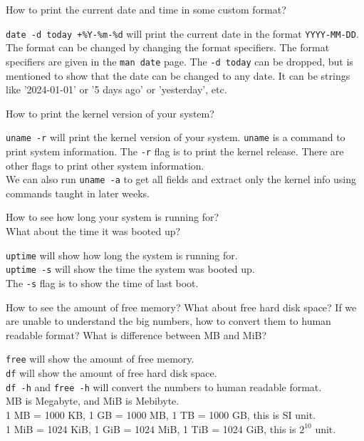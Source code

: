 \begin{qs}
  How to print the current date and time in some custom format?
\end{qs}

\begin{ans}
  \texttt{date -d today +\%Y-\%m-\%d} will print the current date in the format
  \texttt{YYYY-MM-DD}. The format can be changed by changing the format specifiers.
  The format specifiers are given in the \texttt{man date} page. The \texttt{-d today} can
  be dropped, but is mentioned to show that the date can be changed to any date.
  It can be strings like '2024-01-01' or '5 days ago' or 'yesterday', etc.
\end{ans}

\begin{qs}
  How to print the kernel version of your system?
\end{qs}

\begin{ans}
  \texttt{uname -r} will print the kernel version of your system.
  \texttt{uname} is a command to print system information.
  The \texttt{-r} flag is to print the kernel release.
  There are other flags to print other system information. \\
  We can also run \texttt{uname -a} to get all fields and extract only the
  kernel info using commands taught in later weeks.
\end{ans}

\begin{qs}
  How to see how long your system is running for? \\
  What about the time it was booted up?
\end{qs}

\begin{ans}
  \texttt{uptime} will show how long the system is running for.\\
  \texttt{uptime -s} will show the time the system was booted up. \\
  The \texttt{-s} flag is to show the time of last boot.
\end{ans}

\begin{qs}
  How to see the amount of free memory? What about free hard disk space?
  If we are unable to understand the big numbers, how to convert them to human readable format?
  What is difference between MB and MiB?
\end{qs}

\begin{ans}
  \texttt{free} will show the amount of free memory. \\
  \texttt{df} will show the amount of free hard disk space. \\
  \texttt{df -h} and \texttt{free -h}
  will convert the numbers to human readable format. \\
  MB is Megabyte, and MiB is Mebibyte. \\
  1 MB = 1000 KB, 1 GB = 1000 MB, 1 TB = 1000 GB, this is SI unit. \\
  1 MiB = 1024 KiB, 1 GiB = 1024 MiB, 1 TiB = 1024 GiB, this is $2^{10}$ unit.
\end{ans}

